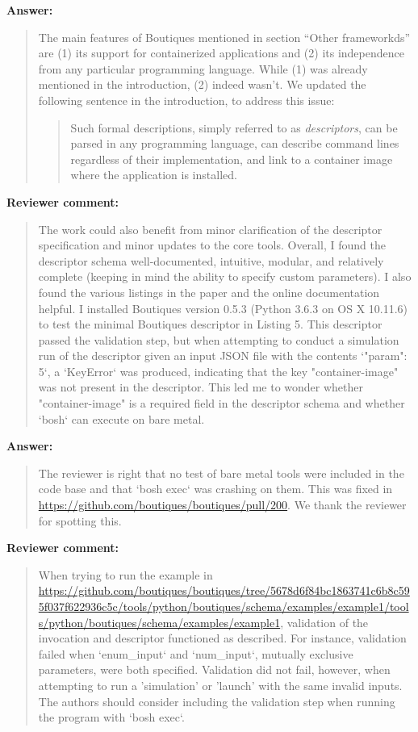 \documentclass[a4]{article}
\newenvironment{review}%
{\textbf{Reviewer comment:}\begin{quote}}%
{\end{quote}}%
\newenvironment{answer}%
{\textbf{Answer:}\begin{quote}}%
{\end{quote}}%
\begin{document}
\begin{answer}
The main features of Boutiques mentioned in section ``Other
frameworkds'' are (1) its support for containerized applications and
(2) its independence from any particular programming language. While
(1) was already mentioned in the introduction, (2) indeed wasn't. We
updated the following sentence in the introduction, to address this
issue:

\begin{quote}
  Such formal descriptions, simply referred
to as \emph{descriptors}, \color{blue}can be parsed in any programming language,
can describe command lines regardless of their implementation,\color{black}
and link to a container image where the application is
installed.
\end{quote}

\end{answer}

\begin{review}
The work could also benefit from minor clarification of the descriptor
specification and minor updates to the core tools. Overall, I found
the descriptor schema well-documented, intuitive, modular, and
relatively complete (keeping in mind the ability to specify custom
parameters). I also found the various listings in the paper and the
online documentation helpful. I installed Boutiques version 0.5.3
(Python 3.6.3 on OS X 10.11.6) to test the minimal Boutiques
descriptor in Listing 5. This descriptor passed the validation step,
but when attempting to conduct a simulation run of the descriptor
given an input JSON file with the contents `{"param": 5}`, a
`KeyError` was produced, indicating that the key "container-image" was
not present in the descriptor. This led me to wonder whether
"container-image" is a required field in the descriptor schema and
whether `bosh` can execute on bare metal.
\end{review}

\begin{answer}
  The reviewer is right that no test of bare metal tools were included
  in the code base and that `bosh exec` was crashing on them. This was
  fixed in \url{https://github.com/boutiques/boutiques/pull/200}. We
  thank the reviewer for spotting this.
\end{answer}


\begin{review}
When trying to run the example in
\url{https://github.com/boutiques/boutiques/tree/5678d6f84bc1863741c6b8c595f037f622936c5c/tools/python/boutiques/schema/examples/example1/tools/python/boutiques/schema/examples/example1},
validation of the invocation and descriptor functioned as
described. For instance, validation failed when `enum\_input` and
`num\_input`, mutually exclusive parameters, were both
specified. Validation did not fail, however, when attempting to run a
'simulation' or 'launch' with the same invalid inputs. The authors
should consider including the validation step when running the program
with `bosh exec`.
\end{review}
\end{document}

